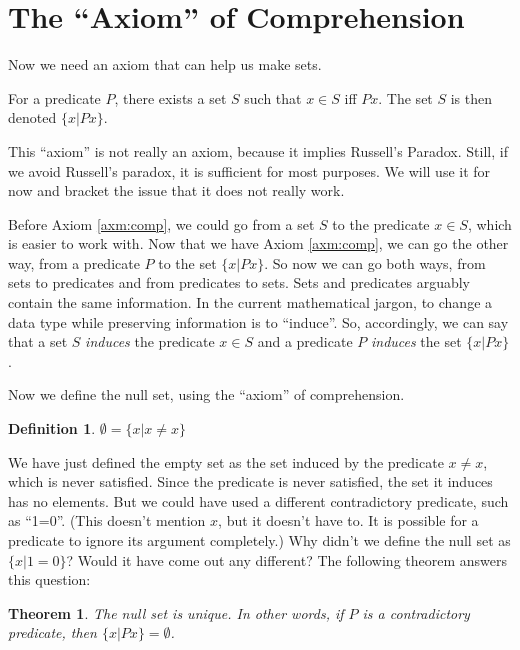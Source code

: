 \documentclass[12pt]{article}
\newcounter{axmmain}
\newenvironment{axm}
 {\stepcounter{axmmain}\axminner}
 {\endaxminner}
\newcounter{dfnc}
\newcounter{thmc}
\newtheorem{dfn}[dfnc]{Definition}
\newtheorem{thm}[thmc]{Theorem}
\begin{document}
\section{The ``Axiom'' of Comprehension}

Now we need an axiom that can help us make sets.

\begin{axm}[``Axiom'' of comprehension]\label{axm:comp}
  For a predicate $P$, there exists a set $S$ such that $x\in S$ iff
  $Px$.  The set $S$ is then denoted $\{x|Px\}$.
\end{axm}

This ``axiom'' is not really an axiom, because it implies Russell's
Paradox.  Still, if we avoid Russell's paradox, it is sufficient for
most purposes.  We will use it for now and bracket the issue that it
does not really work.

Before Axiom \ref{axm:comp}, we could go from a set $S$ to the
predicate $x\in S$, which is easier to work with.  Now that we have
Axiom \ref{axm:comp}, we can go the other way, from a predicate $P$ to
the set $\{x|Px\}$.  So now we can go both ways, from sets to
predicates and from predicates to sets.  Sets and predicates arguably
contain the same information.  In the current mathematical jargon, to
change a data type while preserving information is to ``induce''.  So,
accordingly, we can say that a set $S$ \textit{induces} the predicate
$x\in S$ and a predicate $P$ \textit{induces} the set $\{x|Px\}$.

Now we define the null set, using the ``axiom'' of comprehension.

\begin{dfn}
  $\emptyset=\{x|x\neq x\}$
\end{dfn}

We have just defined the empty set as the set induced by the predicate
$x\neq x$, which is never satisfied.  Since the predicate is never
satisfied, the set it induces has no elements.  But we could have used
a different contradictory predicate, such as ``1=0''. (This doesn't
mention $x$, but it doesn't have to.  It is possible for a predicate
to ignore its argument completely.)  Why didn't we define the null
set as $\{x|1=0\}$?  Would it have come out any different?  The
following theorem answers this question:

\begin{thm}
  The null set is unique.  In other words, if $P$ is a contradictory
  predicate, then $\{x|Px\}=\emptyset$.
\end{thm}
\end{document}
